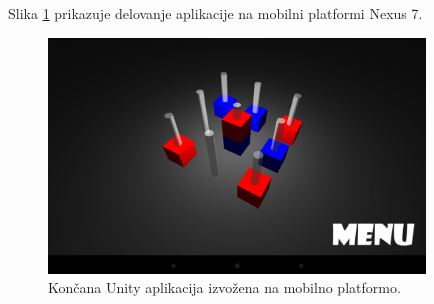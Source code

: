 Slika \ref{minplay} prikazuje delovanje aplikacije na mobilni platformi Nexus 7.

\begin{figure}
\begin{center}
\includegraphics[width=10cm]{pic/min-play.png}
\end{center}
\caption{Končana Unity aplikacija izvožena na mobilno platformo.}
\label{minplay}
\end{figure} 





